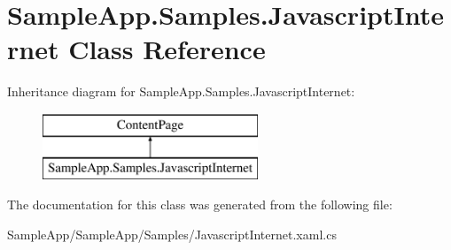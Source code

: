 \hypertarget{class_sample_app_1_1_samples_1_1_javascript_internet}{}\section{Sample\+App.\+Samples.\+Javascript\+Internet Class Reference}
\label{class_sample_app_1_1_samples_1_1_javascript_internet}
Inheritance diagram for Sample\+App.\+Samples.\+Javascript\+Internet\+:\begin{figure}[H]
\begin{center}
\leavevmode
\includegraphics[height=2.000000cm]{class_sample_app_1_1_samples_1_1_javascript_internet}
\end{center}
\end{figure}


The documentation for this class was generated from the following file\+:\begin{DoxyCompactItemize}
\item 
Sample\+App/\+Sample\+App/\+Samples/Javascript\+Internet.\+xaml.\+cs\end{DoxyCompactItemize}
